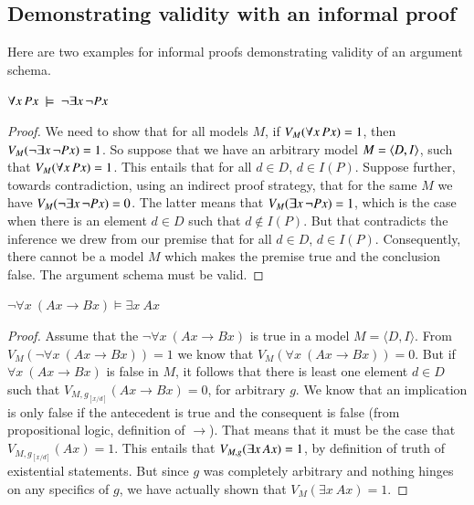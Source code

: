 \documentclass[nobib,nofonts]{tufte-handout}
\begin{document}
\subsection{Demonstrating validity with an informal proof}
\label{sec:demonstr-valid-with}

Here are two examples for informal proofs demonstrating validity of an argument schema.

\begin{claim}
  $\forall x \thinspace Px \ \models \ \neg \exists x \thinspace \neg Px$
\end{claim}

\begin{proof}
  We need to show that for all models $M$, if $V_{M}(\forall x \thinspace Px) = 1$, then $V_{M}(\neg \exists x \thinspace \neg Px) = 1$.
  So suppose that we have an arbitrary model $M = \left \langle D,I\right\rangle$, such that $V_{M}(\forall x \thinspace Px) = 1$.
  This entails that for all $d \in D$, $d \in I(P)$.
  Suppose further, towards contradiction, using an indirect proof strategy, that for the same $M$ we have $V_{M}(\neg \exists x \thinspace \neg Px) = 0$.
  The latter means that $V_{M}(\exists x \thinspace \neg Px) = 1$, which is the case when there is an element $d \in D$ such that $d \not \in I(P)$.
  But that contradicts the inference we drew from our premise that for all $d \in D$, $d \in I(P)$.
  Consequently, there cannot be a model $M$ which makes the premise true and the conclusion false.
  The argument schema must be valid.
\end{proof}

\begin{claim}
  $\neg \forall x \ (Ax \rightarrow Bx) \models \exists x \ Ax$
\end{claim}

\begin{proof}
  Assume that the $\neg \forall x \ (Ax \rightarrow Bx)$ is true in a model $M = \langle D, I \rangle$.
  From $V_M(\neg \forall x \ (Ax \rightarrow Bx))=1$ we know that $V_M(\forall x \ (Ax \rightarrow Bx))=0$.
  But if $\forall x \ (Ax \rightarrow Bx)$ is false in $M$, it follows that there is least
  one element $d \in D$ such that $V_{M, g_{[x/d]}} (Ax \rightarrow Bx) = 0$, for arbitrary $g$.
  We know that an implication is only false if the antecedent is true and the consequent is false (from propositional logic, definition of $\rightarrow$).
  That means that it must be the case that $V_{M, g_{[x/d]}}( Ax ) = 1$.
  This entails that $V_{M, g} (\exists x \thinspace Ax)=1$, by definition of truth of existential statements.
  But since $g$ was completely arbitrary and nothing hinges on any specifics of $g$, we have actually shown that $V_M(\exists x \ Ax) =1$.
\end{proof}
\end{document}
